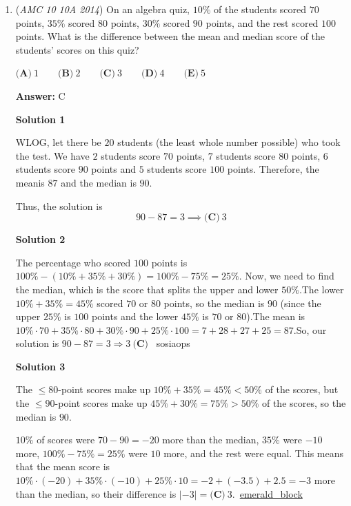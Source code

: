 \begin{enumerate}
 From here, the cases that don't work are the ones where B and Y are adjacent. BY can be treated as a single block; now, we have $3$ slots and $1$ thing to place, so there are $3$ of these cases. 

 Thus, this yields $6-3=3$ total cases. We are done. 

 


	\item (\textit{AMC 10 10A 2014}) On an algebra quiz, $10\%$ of the students scored $70$ points, $35\%$ scored $80$ points, $30\%$ scored $90$ points, and the rest scored $100$ points. What is the difference between the mean and median score of the students' scores on this quiz?


 $\textbf{(A)}\ 1\qquad\textbf{(B)}\ 2\qquad\textbf{(C)}\ 3\qquad\textbf{(D)}\ 4\qquad\textbf{(E)}\ 5$

 \textbf{Answer: }C



\textbf{Solution 1}

WLOG, let there be $20$ students (the least whole number possible) who took the test. We have $2$ students score $70$ points, $7$ students score $80$ points, $6$ students score $90$ points and $5$ students score $100$ points. Therefore, the meanis $87$ and the median is $90$.

 Thus, the solution is 
 \[90-87=3\implies\boxed{\textbf{(C)} \ 3}\]




\textbf{Solution 2}

The percentage who scored $100$ points is $100\%-(10\%+35\%+30\%)=100\%-75\%=25\%$. Now, we need to find the median, which is the score that splits the upper and lower $50\%$.The lower $10\%+35\%=45\%$ scored $70$ or $80$ points, so the median is $90$ (since the upper $25\%$ is $100$ points and the lower $45\%$ is $70$ or $80$).The mean is $10\%\cdot70+35\%\cdot80+30\%\cdot90+25\%\cdot100=7+28+27+25=87$.So, our solution is $90-87=3\Rightarrow\boxed{3 \ \textbf{(C)} }$ ~sosiaops

 



\textbf{Solution 3}

The $\le 80$-point scores make up $10\%+35\% = 45\% < 50\%$ of the scores, but the $\le 90$-point scores make up $45\%+30\% = 75\% > 50\%$ of the scores, so the median is $90$.

 $10\%$ of scores were $70-90 = -20$ more than the median, $35\%$ were $-10$ more, $100\%-75\% = 25\%$ were $10$ more, and the rest were equal. This means that the mean score is $10\%\cdot(-20)+35\%\cdot(-10)+25\%\cdot10 = -2 + (-3.5) + 2.5 = -3$ more than the median, so their difference is $\left|-3\right| = \boxed{\textbf{(C)}\ 3}$.~\href{https://artofproblemsolving.com/wiki/index.php?title=User:Emerald\_block}{emerald\_block}


\end{enumerate}
